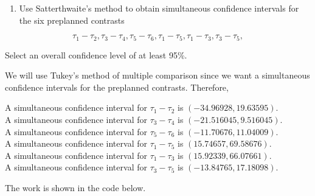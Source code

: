 \documentclass[12pt,]{article}
\providecommand{\tightlist}{%
  \setlength{\itemsep}{0pt}\setlength{\parskip}{0pt}}
\begin{document}
\begin{enumerate}
\def\labelenumi{(\alph{enumi})}
\setcounter{enumi}{1}
\tightlist
\item
  Use Satterthwaite's method to obtain simultaneous confidence intervals
  for the six preplanned contrasts
\end{enumerate}

\[\tau_1 -\tau_2, \tau_3 -\tau_4, \tau_5 -\tau_6, \tau_1 -\tau_5, \tau_1 -\tau_3, \tau_3 -\tau_5,\]

Select an overall confidence level of at least 95\%.

We will use Tukey's method of multiple comparison since we want a
simultaneous confidence intervals for the preplanned contrasts.
Therefore,

\begin{center}
A simultaneous confidence interval for $\tau_1 -\tau_2$ is $(-34.96928,19.63595)$.\\
A simultaneous confidence interval for $\tau_3 -\tau_4$ is $(-21.516045,9.516045)$.\\
A simultaneous confidence interval for $\tau_5 -\tau_6$ is $(-11.70676,11.04009)$.\\
A simultaneous confidence interval for $\tau_1 -\tau_5$ is $(15.74657,69.58676)$.\\
A simultaneous confidence interval for $\tau_1 -\tau_3$ is $(15.92339,66.07661)$.\\
A simultaneous confidence interval for $\tau_3 -\tau_5$ is $(-13.84765,17.18098)$.
\end{center}

The work is shown in the code below.
\end{document}
